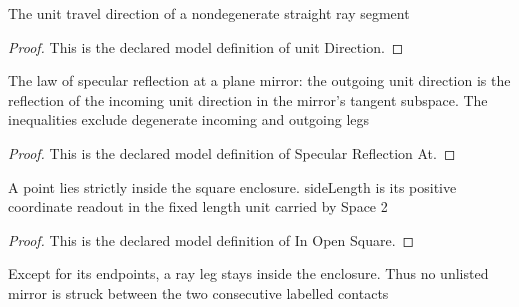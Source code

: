 \begin{definition}
  \label{def:physics:phyx-mini-0024:phyxminiproblems-problemphyxmini0024-unitdirection}
  The unit travel direction of a nondegenerate straight ray segment
\end{definition}
\begin{proof}
  This is the declared model definition of unit Direction.
\end{proof}
\begin{definition}
  \label{def:physics:phyx-mini-0024:phyxminiproblems-problemphyxmini0024-specularreflectionat}
  The law of specular reflection at a plane mirror: the outgoing unit direction is the reflection of the incoming unit direction in the mirror's tangent subspace. The inequalities exclude degenerate incoming and outgoing legs
\end{definition}
\begin{proof}
  This is the declared model definition of Specular Reflection At.
\end{proof}
\begin{definition}
  \label{def:physics:phyx-mini-0024:phyxminiproblems-problemphyxmini0024-inopensquare}
  A point lies strictly inside the square enclosure. sideLength is its positive coordinate readout in the fixed length unit carried by Space 2
\end{definition}
\begin{proof}
  This is the declared model definition of In Open Square.
\end{proof}
\begin{definition}
  \label{def:physics:phyx-mini-0024:phyxminiproblems-problemphyxmini0024-opensegmentinside}
  Except for its endpoints, a ray leg stays inside the enclosure. Thus no unlisted mirror is struck between the two consecutive labelled contacts
\end{definition}
